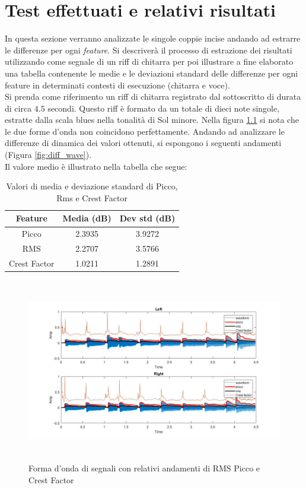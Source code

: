 \documentclass[12pt]{report}
\begin{document}
\chapter{Test effettuati e relativi risultati}
\label{cap4}
In questa sezione verranno analizzate le singole coppie incise andando ad estrarre le differenze per ogni {\itshape feature}. Si descriverà il processo di estrazione dei risultati utilizzando come segnale di un riff di chitarra per poi illustrare a fine elaborato una tabella contenente le medie e le deviazioni standard delle differenze per ogni feature in determinati contesti di esecuzione (chitarra e voce).\\

Si prenda come riferimento un riff di chitarra registrato dal sottoscritto di durata di circa $4.5$ secondi. Questo riff è formato da un totale di dieci note singole, estratte dalla scala blues nella tonalità di Sol minore.
Nella figura \ref{fig:wave} si nota che le due forme d'onda non coincidono perfettamente.
Andando ad analizzare le differenze di dinamica dei valori ottenuti, si espongono i seguenti andamenti (Figura \ref{fig:diff_wave}).\\
Il valore medio è illustrato nella tabella che segue:

\begin{table}[h]
\begin{center}
\begin{tabular}{|c|c|c|}
\hline
Feature & Media (dB) & Dev std (dB)\\
\hline
Picco & 2.3935 & 3.9272\\

RMS & 2.2707 & 3.5766\\

Crest Factor & 1.0211 & 1.2891\\
\hline
\end{tabular}
\end{center}
\caption{Valori di media e deviazione standard di Picco, Rms e Crest Factor}
\label{tab:diff_wave}
\end{table}

\begin{figure}[htbp]
\centerline{\includegraphics[height=80mm]{img/wave}}
\caption{Forma d'onda di segnali con relativi andamenti di RMS Picco e Crest Factor}
\label{fig:wave}
\end{figure}
\end{document}
